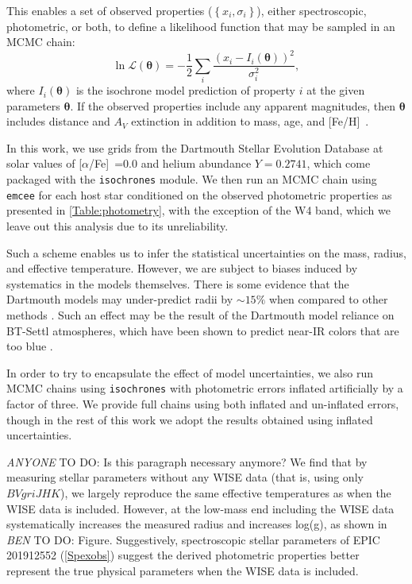 \documentclass{emulateapj}
\newcommand{\logg}{{log(g)}}
\newcommand{\feh}{{[Fe/H]}~}
\newcommand{\afe}{{[$\alpha$/Fe]}~}
\newcommand{\todo}[3]{{\color{#2} \emph{#1} TO DO: #3}}
\newcommand{\btmtodo}[1]{\todo{BEN}{red}{#1}}
\newcommand{\anytodo}[1]{\todo{ANYONE}{NavyBlue}{#1}}
\begin{document}
This enables a set of observed properties ($\left\{ x_i, \sigma_i \right\}$), 
either spectroscopic, photometric, 
or both, to define a likelihood function that may be sampled in
an MCMC chain:
\begin{equation}
\label{eq:ischochronelhood}
\ln \mathcal L(\boldsymbol{\theta}) = -\frac{1}{2} \displaystyle \sum_i \frac{\left(x_i - 
  I_i\left(\boldsymbol{\theta} \right)\right)^2}{\sigma_i^2},
\end{equation}
where $I_i(\boldsymbol{\theta})$ is the isochrone model prediction of property 
$i$ at the given parameters $\boldsymbol{\theta}$.  
If the observed properties include any apparent magnitudes, then 
$\boldsymbol{\theta}$ includes distance and $A_V$ extinction in addition 
to mass, age, and \feh.

In this work, we use grids from the Dartmouth Stellar
Evolution Database \citep{Dotter08} at solar values of \afe=$0.0$ and
helium abundance $Y=0.2741$, which come packaged with the \texttt{isochrones}
module.  
We then run an MCMC chain using \texttt{emcee} \citep{Foreman-Mackey12}
for each host star conditioned on the observed 
photometric properties as presented in \ref{Table:photometry}, with 
the exception of the W4 band, which we leave out this analysis due to 
its unreliability.  

Such a scheme enables us to infer the statistical uncertainties on the
mass, radius, and effective temperature.
However, we are subject to biases induced by systematics in the models themselves.
There is some evidence that the Dartmouth models may under-predict
radii by $\sim 15\%$ when compared to other methods \citep{Newton15,
Montet15}.
Such an effect may be the result of the Dartmouth model reliance on BT-Settl
atmospheres, which have been shown to predict near-IR colors that are too blue
\citep{Thompson14}.

In order to try to encapsulate the effect of model uncertainties, we also run 
MCMC chains using \texttt{isochrones} with photometric errors inflated 
artificially by a factor of three.  We provide full chains using both
inflated and un-inflated errors, though in the rest of this work we adopt
the results obtained using inflated uncertainties.

\anytodo{Is this paragraph necessary anymore?}
We find that by measuring stellar parameters without any WISE data (that is, using
only $BVgriJHK$), we largely reproduce the same effective temperatures as when
the WISE data is included.
However, at the low-mass end including the WISE data systematically increases the
measured radius and increases \logg, as shown in \btmtodo{Figure}.
Suggestively, spectroscopic stellar parameters of EPIC 201912552
(\textsection\ref{Spexobs}) suggest the derived photometric properties better
represent the true physical parameters when the WISE data is included.
\end{document}
